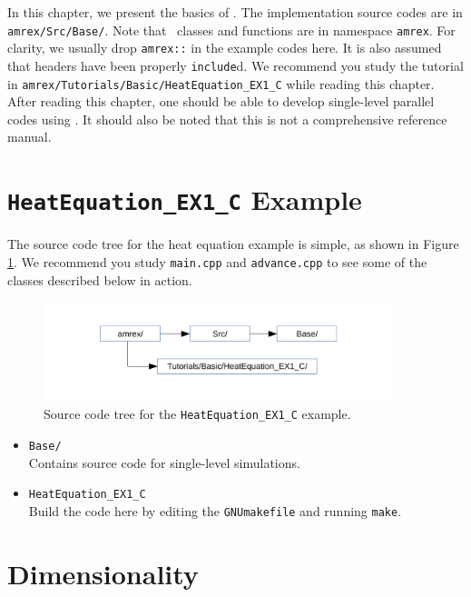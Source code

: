 In this chapter, we present the basics of \amrex.  The implementation
source codes are in {\tt amrex/Src/Base/}.  Note that \amrex\ classes
and functions are in namespace {\tt amrex}.  For clarity, we usually
drop {\tt amrex::} in the example codes here.  It is also assumed that
headers have been properly {\tt include}d.  We recommend you study
the tutorial in {\tt amrex/Tutorials/Basic/HeatEquation\_EX1\_C} while reading this chapter.
After reading this chapter, one should be able to develop single-level
parallel codes using \amrex.  It should also be noted that this is not
a comprehensive reference manual.

\section{{\tt HeatEquation\_EX1\_C} Example}
The source code tree for the heat equation example is simple, as shown
in Figure \ref{fig:Basics_Heat_flowchart}.  We recommend you study
{\tt main.cpp} and {\tt advance.cpp} to see some of the classes described
below in action.
\begin{figure}[htb]
\begin{center}
\includegraphics[width=4in]{./Basics/figs/flowchart.pdf}
\caption{\label{fig:Basics_Heat_flowchart} Source code tree for the 
         {\tt HeatEquation\_EX1\_C} example.}
\end{center}
\end{figure}
\begin{itemize}
\item {\tt Base/}\\
Contains source code for single-level \amrex simulations.
\item {\tt HeatEquation\_EX1\_C} \\
Build the code here by editing the {\tt GNUmakefile} and running {\tt make}.
\end{itemize}

\section{Dimensionality}
\label{sec:basics:dim}

